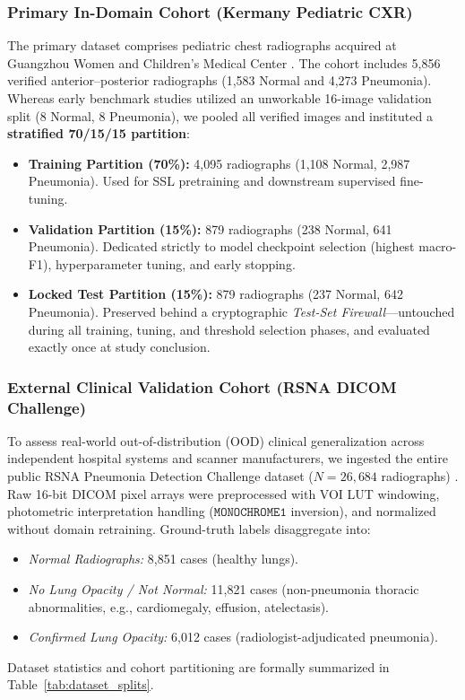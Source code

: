 \documentclass[journal,article,submit,moreauthors,pdftex]{Definitions/tsp}
\begin{document}
\subsubsection{Primary In-Domain Cohort (Kermany Pediatric CXR)}
The primary dataset comprises pediatric chest radiographs acquired at Guangzhou Women and Children's Medical Center \cite{Kermany18}. The cohort includes 5,856 verified anterior--posterior radiographs (1,583 Normal and 4,273 Pneumonia). Whereas early benchmark studies utilized an unworkable 16-image validation split (8 Normal, 8 Pneumonia), we pooled all verified images and instituted a \textbf{stratified 70/15/15 partition}:
\begin{itemize}
    \item \textbf{Training Partition (70\%):} 4,095 radiographs (1,108 Normal, 2,987 Pneumonia). Used for SSL pretraining and downstream supervised fine-tuning.
    \item \textbf{Validation Partition (15\%):} 879 radiographs (238 Normal, 641 Pneumonia). Dedicated strictly to model checkpoint selection (highest macro-F1), hyperparameter tuning, and early stopping.
    \item \textbf{Locked Test Partition (15\%):} 879 radiographs (237 Normal, 642 Pneumonia). Preserved behind a cryptographic \emph{Test-Set Firewall}---untouched during all training, tuning, and threshold selection phases, and evaluated exactly once at study conclusion.
\end{itemize}

\subsubsection{External Clinical Validation Cohort (RSNA DICOM Challenge)}
To assess real-world out-of-distribution (OOD) clinical generalization across independent hospital systems and scanner manufacturers, we ingested the entire public RSNA Pneumonia Detection Challenge dataset ($N=26,684$ radiographs) \cite{Shih19}. Raw 16-bit DICOM pixel arrays were preprocessed with VOI LUT windowing, photometric interpretation handling ($\mathtt{MONOCHROME1}$ inversion), and normalized without domain retraining. Ground-truth labels disaggregate into:
\begin{itemize}
    \item \emph{Normal Radiographs:} 8,851 cases (healthy lungs).
    \item \emph{No Lung Opacity / Not Normal:} 11,821 cases (non-pneumonia thoracic abnormalities, e.g., cardiomegaly, effusion, atelectasis).
    \item \emph{Confirmed Lung Opacity:} 6,012 cases (radiologist-adjudicated pneumonia).
\end{itemize}
Dataset statistics and cohort partitioning are formally summarized in Table~\ref{tab:dataset_splits}.
\end{document}
